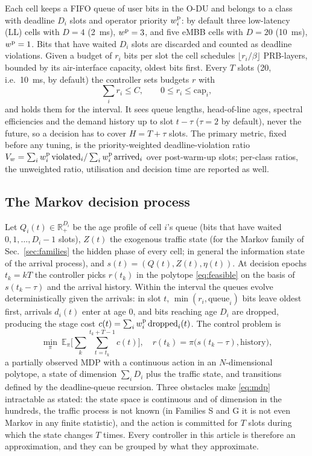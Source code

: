 \documentclass[journal]{IEEEtran}
\newcommand{\E}{\mathbb{E}}
\begin{document}
Each cell keeps a FIFO queue of user bits in the O-DU and belongs to a class with deadline $D_i$ slots and operator priority $w_i^{\rm p}$: by default three low-latency (LL) cells with $D = 4$ (2~ms), $w^{\rm p} = 3$, and five eMBB cells with $D = 20$ (10~ms), $w^{\rm p} = 1$. Bits that have waited $D_i$ slots are discarded and counted as deadline violations. Given a budget of $r_i$ bits per slot the cell schedules $\lfloor r_i/\beta\rfloor$ PRB-layers, bounded by its air-interface capacity, oldest bits first. Every $T$ slots (20, i.e.\ 10~ms, by default) the controller sets budgets $r$ with
\begin{equation}
\textstyle\sum_i r_i \le C, \qquad 0 \le r_i \le \mathrm{cap}_i,
\label{eq:feasible}
\end{equation}
and holds them for the interval. It sees queue lengths, head-of-line ages, spectral efficiencies and the demand history up to slot $t - \tau$ ($\tau = 2$ by default), never the future, so a decision has to cover $H = T + \tau$ slots. The primary metric, fixed before any tuning, is the priority-weighted deadline-violation ratio $V_w = \sum_i w_i^{\rm p}\,\mathrm{violated}_i / \sum_i w_i^{\rm p}\,\mathrm{arrived}_i$ over post-warm-up slots; per-class ratios, the unweighted ratio, utilisation and decision time are reported as well.

\subsection{The Markov decision process}
\label{sec:mdp}
Let $Q_i(t) \in \mathbb{R}_+^{D_i}$ be the age profile of cell $i$'s queue (bits that have waited $0, 1, \dots, D_i - 1$ slots), $Z(t)$ the exogenous traffic state (for the Markov family of Sec.~\ref{sec:families} the hidden phase of every cell; in general the information state of the arrival process), and $s(t) = (Q(t), Z(t), \eta(t))$. At decision epochs $t_k = kT$ the controller picks $r(t_k)$ in the polytope \eqref{eq:feasible} on the basis of $s(t_k - \tau)$ and the arrival history. Within the interval the queues evolve deterministically given the arrivals: in slot $t$, $\min(r_i, \text{queue}_i)$ bits leave oldest first, arrivals $d_i(t)$ enter at age 0, and bits reaching age $D_i$ are dropped, producing the stage cost $c(t) = \sum_i w_i^{\rm p}\,\mathrm{dropped}_i(t)$. The control problem is
\begin{equation}
\min_{\pi}\ \E_\pi\Big[\sum_{k} \sum_{t = t_k}^{t_k + T - 1} c(t)\Big],\quad r(t_k) = \pi\big(s(t_k - \tau), \text{history}\big),
\label{eq:mdp}
\end{equation}
a partially observed MDP with a continuous action in an $N$-dimensional polytope, a state of dimension $\sum_i D_i$ plus the traffic state, and transitions defined by the deadline-queue recursion. Three obstacles make \eqref{eq:mdp} intractable as stated: the state space is continuous and of dimension in the hundreds, the traffic process is not known (in Families S and G it is not even Markov in any finite statistic), and the action is committed for $T$ slots during which the state changes $T$ times. Every controller in this article is therefore an approximation, and they can be grouped by what they approximate.
\end{document}
